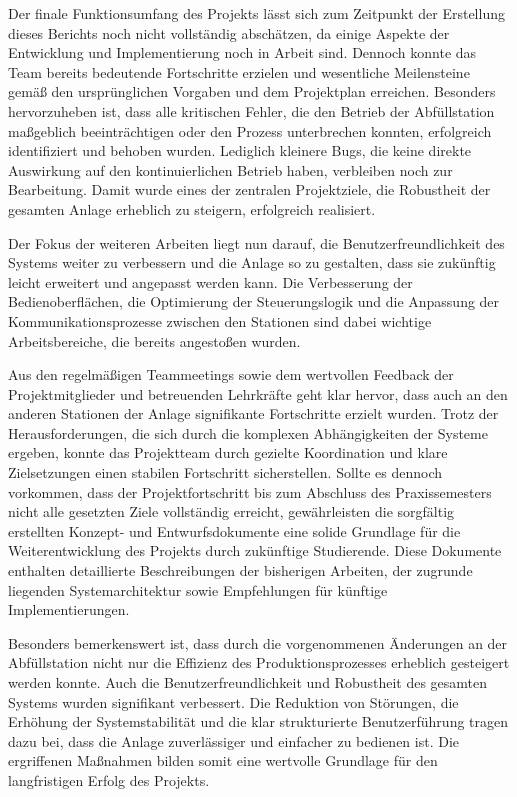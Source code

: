 Der finale Funktionsumfang des Projekts lässt sich zum Zeitpunkt der Erstellung dieses Berichts noch nicht vollständig abschätzen, da einige 
Aspekte der Entwicklung und Implementierung noch in Arbeit sind. Dennoch konnte das Team bereits bedeutende Fortschritte erzielen und wesentliche 
Meilensteine gemäß den ursprünglichen Vorgaben und dem Projektplan erreichen. Besonders hervorzuheben ist, dass alle kritischen Fehler, die den 
Betrieb der Abfüllstation maßgeblich beeinträchtigen oder den Prozess unterbrechen konnten, erfolgreich identifiziert und behoben wurden. 
Lediglich kleinere Bugs, die keine direkte Auswirkung auf den kontinuierlichen Betrieb haben, verbleiben noch zur Bearbeitung. Damit wurde 
eines der zentralen Projektziele, die Robustheit der gesamten Anlage erheblich zu steigern, erfolgreich realisiert.

Der Fokus der weiteren Arbeiten liegt nun darauf, die Benutzerfreundlichkeit des Systems weiter zu verbessern und die Anlage so zu gestalten, 
dass sie zukünftig leicht erweitert und angepasst werden kann. Die Verbesserung der Bedienoberflächen, die Optimierung der Steuerungslogik und 
die Anpassung der Kommunikationsprozesse zwischen den Stationen sind dabei wichtige Arbeitsbereiche, die bereits angestoßen wurden.

Aus den regelmäßigen Teammeetings sowie dem wertvollen Feedback der Projektmitglieder und betreuenden Lehrkräfte geht klar hervor, dass auch an 
den anderen Stationen der Anlage signifikante Fortschritte erzielt wurden. Trotz der Herausforderungen, die sich durch die komplexen 
Abhängigkeiten der Systeme ergeben, konnte das Projektteam durch gezielte Koordination und klare Zielsetzungen einen stabilen Fortschritt 
sicherstellen. Sollte es dennoch vorkommen, dass der Projektfortschritt bis zum Abschluss des Praxissemesters nicht alle gesetzten Ziele 
vollständig erreicht, gewährleisten die sorgfältig erstellten Konzept- und Entwurfsdokumente eine solide Grundlage für die Weiterentwicklung 
des Projekts durch zukünftige Studierende. Diese Dokumente enthalten detaillierte Beschreibungen der bisherigen Arbeiten, der zugrunde liegenden 
Systemarchitektur sowie Empfehlungen für künftige Implementierungen.

Besonders bemerkenswert ist, dass durch die vorgenommenen Änderungen an der Abfüllstation nicht nur die Effizienz des Produktionsprozesses 
erheblich gesteigert werden konnte. Auch die Benutzerfreundlichkeit und Robustheit des gesamten Systems wurden signifikant verbessert. 
Die Reduktion von Störungen, die Erhöhung der Systemstabilität und die klar strukturierte Benutzerführung tragen dazu bei, dass die Anlage 
zuverlässiger und einfacher zu bedienen ist. Die ergriffenen Maßnahmen bilden somit eine wertvolle Grundlage für den langfristigen Erfolg 
des Projekts.

